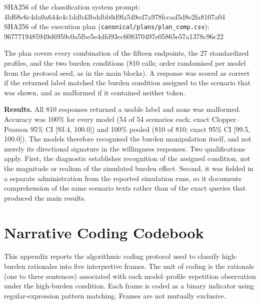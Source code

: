 \documentclass[11pt]{article}
\begin{document}
\begin{flushleft}
{\footnotesize SHA256 of the classification system prompt:}\\
{\footnotesize\ttfamily 4bf68c6c4da0a644e4c1ddb43bddbb0d9fa549ed7a978fccad5d8e2fa8107a04}\\
{\footnotesize SHA256 of the execution plan (\texttt{canonical/plans/plan\_comp.csv}):}\\
{\footnotesize\ttfamily 9677719485949d6959c0a5fbe5e4dfd93cc608370497e05865e57a1378c96c22}
\end{flushleft}

The plan covers every combination of the fifteen endpoints, the 27 standardized profiles, and the two burden conditions (810 calls; order randomised per model from the protocol seed, as in the main blocks). A response was scored as correct if the returned label matched the burden condition assigned to the scenario that was shown, and as malformed if it contained neither token.

\textbf{Results.} All 810 responses returned a usable label and none was malformed. Accuracy was 100\% for every model (54 of 54 scenarios each; exact Clopper--Pearson 95\% CI [93.4, 100.0]) and 100\% pooled (810 of 810; exact 95\% CI [99.5, 100.0]). The models therefore recognised the burden manipulation itself, and not merely its directional signature in the willingness responses. Two qualifications apply. First, the diagnostic establishes recognition of the assigned condition, not the magnitude or realism of the simulated burden effect. Second, it was fielded in a separate administration from the reported simulation runs, so it documents comprehension of the same scenario texts rather than of the exact queries that produced the main results.


\clearpage   %
\section{Narrative Coding Codebook}
\label{app:narrative-codebook}

This appendix reports the algorithmic coding protocol used to classify high-burden rationales into five interpretive frames. The unit of coding is the rationale (one to three sentences) associated with each model--profile--repetition observation under the high-burden condition. Each frame is coded as a binary indicator using regular-expression pattern matching. Frames are not mutually exclusive.
\end{document}
